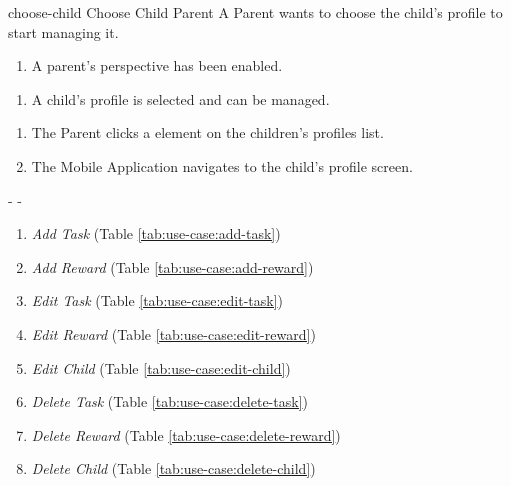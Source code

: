 {choose-child}
{Choose Child}
{Parent}
{A Parent wants to choose the child's profile to start managing it.}
{\begin{enumerate} %
    \item A parent's perspective has been enabled.
\end{enumerate}}
{\begin{enumerate} %
   \item A child's profile is selected and can be managed.
\end{enumerate}}
{\begin{enumerate} %
   \item The Parent clicks a  element on the children's profiles list.
   \item The Mobile Application navigates to the child's profile screen.
\end{enumerate}}
{-} %
{-} %
{\begin{enumerate} %
   \item \textit{Add Task} (Table \ref{tab:use-case:add-task})
   \item \textit{Add Reward} (Table \ref{tab:use-case:add-reward})
   \item \textit{Edit Task} (Table \ref{tab:use-case:edit-task})
   \item \textit{Edit Reward} (Table \ref{tab:use-case:edit-reward})
   \item \textit{Edit Child} (Table \ref{tab:use-case:edit-child})
   \item \textit{Delete Task} (Table \ref{tab:use-case:delete-task})
   \item \textit{Delete Reward} (Table \ref{tab:use-case:delete-reward})
   \item \textit{Delete Child} (Table \ref{tab:use-case:delete-child})
\end{enumerate}}

